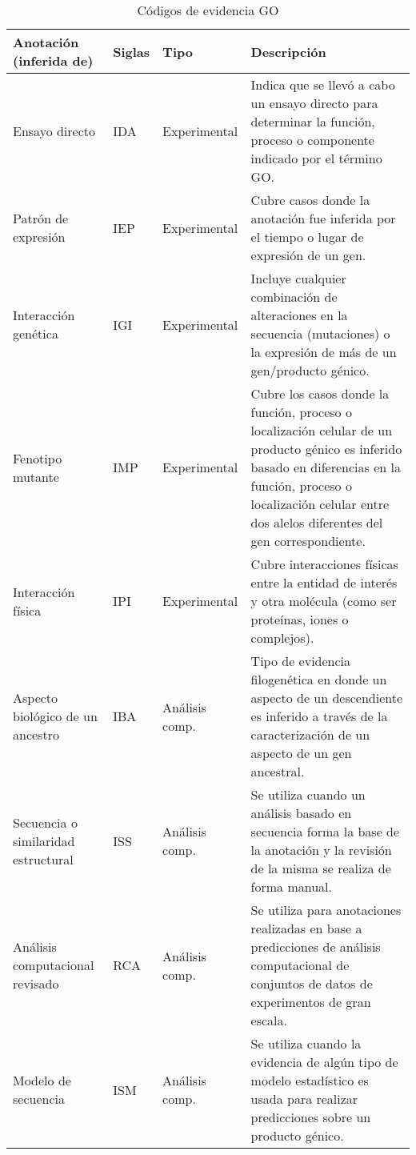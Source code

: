 \begin{sidewaystable}
\centering
\begin{tabular}{| p{4cm} | p{1cm} | p{3cm} | p{8cm} |}
\hline
Anotación (inferida de)      & Siglas & Tipo & Descripción \\
\hline
Ensayo directo        & IDA & Experimental & Indica que se llevó a cabo un ensayo directo para determinar la función, proceso o componente indicado por el término GO. \\
\hline
Patrón de expresión   & IEP & Experimental & Cubre casos donde la anotación fue inferida por el tiempo o lugar de expresión de un gen. \\
\hline
Interacción genética  & IGI & Experimental & Incluye cualquier combinación de alteraciones en la secuencia (mutaciones) o la expresión de más de un gen/producto génico.\\
\hline
Fenotipo mutante      & IMP & Experimental & Cubre los casos donde la función, proceso o localización celular de un producto génico es inferido basado en diferencias en la función, proceso o localización celular entre dos alelos diferentes del gen correspondiente.\\
\hline
Interacción física    & IPI & Experimental & Cubre interacciones físicas entre la entidad de interés y otra molécula (como ser proteínas, iones o complejos).\\                                    
\hline
Aspecto biológico de un ancestro & IBA & Análisis comp. & Tipo de evidencia filogenética en donde un aspecto de un descendiente es inferido a través de la caracterización de un aspecto de un gen ancestral.\\                                             
\hline
Secuencia o similaridad estructural & ISS & Análisis comp. & Se utiliza cuando un análisis basado en secuencia forma la base de la anotación y la revisión de la misma se realiza de forma manual.\\                                             
\hline
Análisis computacional revisado & RCA & Análisis comp. & Se utiliza para anotaciones realizadas en base a predicciones de análisis computacional de conjuntos de datos de experimentos de gran escala.\\    
\hline                                         
Modelo de secuencia & ISM & Análisis comp. & Se utiliza cuando la evidencia de algún tipo de modelo estadístico es usada para realizar predicciones sobre un producto génico.\\                                             
\hline
\end{tabular}
\caption{Códigos de evidencia GO}
\label{tab:tipos_de_anotaciones}
\end{sidewaystable}
